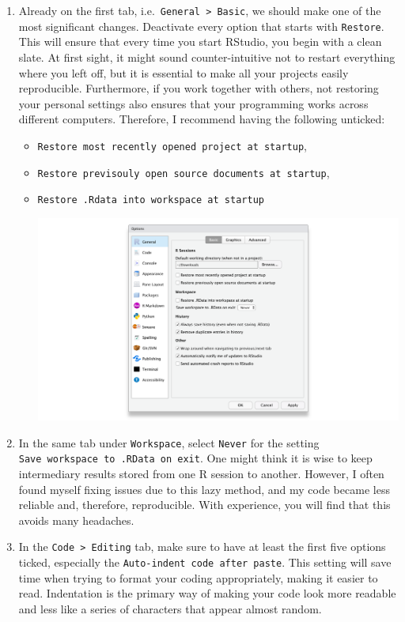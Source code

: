 \documentclass[
  letterpaper,
]{krantz}
\begin{document}
\begin{enumerate}
\def\labelenumi{\arabic{enumi}.}
\item
  Already on the first tab,
  i.e.~\texttt{General\ \textgreater{}\ Basic}, we should make one of
  the most significant changes. Deactivate every option that starts with
  \texttt{Restore}. This will ensure that every time you start RStudio,
  you begin with a clean slate. At first sight, it might sound
  counter-intuitive not to restart everything where you left off, but it
  is essential to make all your projects easily reproducible.
  Furthermore, if you work together with others, not restoring your
  personal settings also ensures that your programming works across
  different computers. Therefore, I recommend having the following
  unticked:

  \begin{itemize}
  \item
    \texttt{Restore\ most\ recently\ opened\ project\ at\ startup},
  \item
    \texttt{Restore\ previsouly\ open\ source\ documents\ at\ startup},
  \item
    \texttt{Restore\ .Rdata\ into\ workspace\ at\ startup}

    \includegraphics{images/chapter_03_img/rstudio_preferences/00_rstudio_preferences_basic.png}
  \end{itemize}
\item
  In the same tab under \texttt{Workspace}, select \texttt{Never} for
  the setting \texttt{Save\ workspace\ to\ .RData\ on\ exit}. One might
  think it is wise to keep intermediary results stored from one R
  session to another. However, I often found myself fixing issues due to
  this lazy method, and my code became less reliable and, therefore,
  reproducible. With experience, you will find that this avoids many
  headaches.
\item
  In the \texttt{Code\ \textgreater{}\ Editing} tab, make sure to have
  at least the first five options ticked, especially the
  \texttt{Auto-indent\ code\ after\ paste}. This setting will save time
  when trying to format your coding appropriately, making it easier to
  read. Indentation is the primary way of making your code look more
  readable and less like a series of characters that appear almost
  random.


\end{enumerate}
\end{document}
